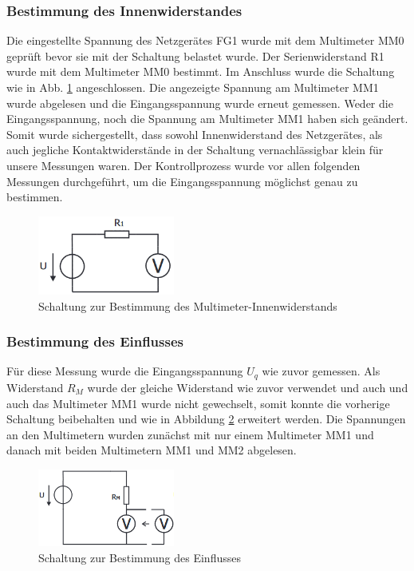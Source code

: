 \documentclass[a4paper]{article}
\begin{document}
\subsubsection*{Bestimmung des Innenwiderstandes}
Die eingestellte Spannung des Netzgerätes FG1 wurde mit dem Multimeter MM0 
geprüft bevor sie mit der Schaltung belastet wurde. Der Serienwiderstand R1 wurde
mit dem Multimeter MM0 bestimmt.
Im Anschluss wurde die Schaltung wie in Abb. \ref{fig:RiVM} angeschlossen.
Die angezeigte Spannung am Multimeter MM1 wurde abgelesen und die Eingangsspannung
wurde erneut gemessen. Weder die Eingangsspannung, noch die Spannung am Multimeter
MM1 haben sich geändert. Somit wurde sichergestellt, dass sowohl Innenwiderstand
des Netzgerätes, als auch jegliche Kontaktwiderstände in der Schaltung
vernachlässigbar klein für unsere Messungen waren.\newline
Der Kontrollprozess wurde vor allen folgenden Messungen durchgeführt, um die
Eingangsspannung möglichst genau zu bestimmen.
\begin{figure}[h]
    \centering
    \includegraphics[width=0.4\textwidth]{schematics/1a_RiVM.png}
    \caption{Schaltung zur Bestimmung des Multimeter-Innenwiderstands}
    \label{fig:RiVM}
\end{figure}

\subsubsection*{Bestimmung des Einflusses}
Für diese Messung wurde die Eingangsspannung $U_{q}$ wie zuvor gemessen.
Als Widerstand $R_{M}$ wurde der gleiche Widerstand wie zuvor verwendet und auch
und auch das Multimeter MM1 wurde nicht gewechselt, somit konnte die vorherige
Schaltung beibehalten und wie in Abbildung \ref{fig:1b_EinflussVM} erweitert werden.
Die Spannungen an den Multimetern wurden zunächst mit nur einem Multimeter MM1
und danach mit beiden Multimetern MM1 und MM2 abgelesen.
\begin{figure}[h]
    \centering
    \includegraphics[width=0.4\textwidth]{schematics/1b_EinflussVM.png}
    \caption{Schaltung zur Bestimmung des Einflusses}
    \label{fig:1b_EinflussVM}
\end{figure}
\end{document}
